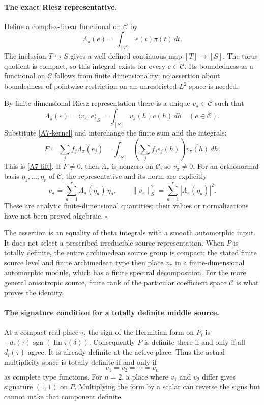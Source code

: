 \paragraph{The exact Riesz representative.}
Define a complex-linear functional on $\mathcal C$ by
\[
 \Lambda_\pi(e)=\int_{[T]}e(t)\pi(t)\,dt.
\]
The inclusion $T\hookrightarrow S$ gives a well-defined continuous
map $[T]\to[S]$. The torus quotient is compact, so this integral
exists for every $e\in\mathcal C$. Its boundedness as a functional
on $\mathcal C$ follows from finite dimensionality; no assertion
about boundedness of pointwise restriction on an unrestricted
$L^2$ space is needed.

By finite-dimensional Riesz representation there is a unique
$v_\pi\in\mathcal C$ such that
\[
 \Lambda_\pi(e)=\langle v_\pi,e\rangle_S
               =\int_{[S]}\overline{v_\pi(h)}e(h)\,dh
 \quad(e\in\mathcal C).
\]
Substitute \eqref{A7-kernel} and interchange the finite sum and
the integrals:
\[
 F=\sum_jf_j\Lambda_\pi(e_j)
   =\int_{[S]}\left(\sum_jf_je_j(h)\right)
                                  \overline{v_\pi(h)}\,dh.
\]
This is \eqref{A7-lift}. If $F\ne0$, then
$\Lambda_\pi$ is nonzero on $\mathcal C$, so $v_\pi\ne0$.
For an orthonormal basis $\eta_1,\ldots,\eta_r$ of $\mathcal C$,
the representative and its norm are explicitly
\[
 v_\pi=\sum_{a=1}^r
              \overline{\Lambda_\pi(\eta_a)}\,\eta_a,
 \qquad
 \|v_\pi\|_S^2=\sum_{a=1}^r|\Lambda_\pi(\eta_a)|^2.
\]
These are analytic finite-dimensional quantities; their values
or normalizations have not been proved algebraic.
\hfill$\square$

The assertion is an equality of theta integrals with a smooth
automorphic input. It does not select a prescribed irreducible
source representation. When $P$ is totally definite, the entire
archimedean source group is compact; the stated finite source
level and finite archimedean type then place $v_\pi$ in a
finite-dimensional automorphic module, which has a finite
spectral decomposition. For the more general anisotropic source,
finite rank of the particular coefficient space $\mathcal C$
is what proves the identity.

\paragraph{The signature condition for a totally definite middle source.}
At a compact real place $\tau$, the sign of the Hermitian form on
$P_i$ is
$-d_i(\tau)\operatorname{sgn}(\operatorname{Im}\tau(\delta))$.
Consequently $P$ is definite there if and only if all
$d_i(\tau)$ agree. It is already definite at the active place.
Thus the actual multiplicity space is totally definite if and
only if
\[
 v_1=v_2=\cdots=v_n
\]
as complete type functions. For $n=2$, a place where $v_1$
and $v_2$ differ gives signature $(1,1)$ on $P$. Multiplying
the form by a scalar can reverse the signs but cannot make that
component definite.

